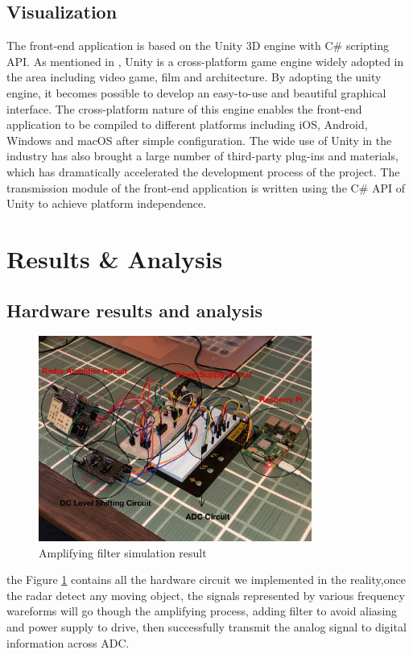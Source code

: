 \subsection{Visualization}
The front-end application is based on the Unity 3D engine with C\# scripting API. As mentioned in \textcite{unity}, Unity is a cross-platform game engine widely adopted in the area including video game, film and architecture. By adopting the unity engine, it becomes possible to develop an easy-to-use and beautiful graphical interface. The cross-platform nature of this engine enables the front-end application to be compiled to different platforms including iOS, Android, Windows and macOS after simple configuration. The wide use of Unity in the industry has also brought a large number of third-party plug-ins and materials, which has dramatically accelerated the development process of the project. The transmission module of the front-end application is written using the C\# API of Unity to achieve platform independence.


\section{Results \& Analysis}
\subsection{Hardware results and analysis}
\begin{figure}[H]
    \centering
    \includegraphics[width=0.8\textwidth]{figure/Hardware Appearance.jpg}
    \caption{Amplifying filter simulation result}
     \label{fig:hardware}
\end{figure}
the Figure \ref{fig:hardware} contains all the hardware circuit we implemented in the reality,once the radar detect any moving object, the signals represented by various frequency wareforms will go though the amplifying process, adding filter to avoid aliasing and power supply to drive, then successfully transmit the analog signal to digital information across ADC.
